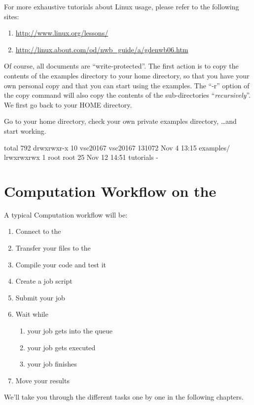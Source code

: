  For more exhaustive tutorials about Linux usage,
please refer to the following sites:

\begin{enumerate}
  \item \url{http://www.linux.org/lessons/}
  \item \url{http://linux.about.com/od/nwb\_guide/a/gdenwb06.htm}
\end{enumerate}

Of course, all documents are ``write-protected''. The first action is to copy
the contents of the \hpc examples directory to your home directory, so that you
have your own personal copy and that you can start using the examples. The
``-r'' option of the copy command will also copy the contents of the
sub-directories ``\emph{recursively}''.  We first go back to your HOME
directory.

\begin{prompt}
\end{prompt}

Go to your home directory, check your own private examples directory, \dots  and start working.

\begin{prompt}
total 792
drwxrwxr-x 10 vsc20167 vsc20167 131072 Nov  4 13:15 examples/
lrwxrwxrwx 1  root     root         25 Nov 12 14:51 tutorials -%
\end{prompt}

\section{Computation Workflow on the \hpc}
\label{sec:compuation-workflow-on-the-hpc}

A typical Computation workflow will be:

\begin{enumerate}
  \item  Connect to the \hpc
  \item  Transfer your files to the \hpc
  \item  Compile your code and test it
  \item  Create a job script
  \item  Submit your job
  \item  Wait while
  \begin{enumerate}
    \item  your job gets into the queue
    \item  your job gets executed
    \item  your job finishes
  \end{enumerate}
  \item  Move your results
\end{enumerate}

We'll take you through the different tasks one by one in the following
chapters.
